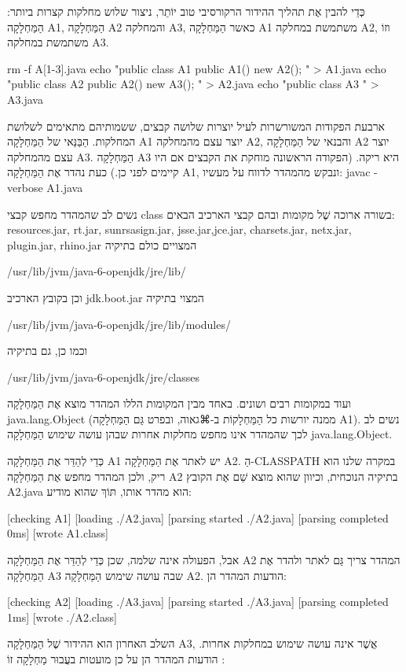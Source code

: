 כְּדֵי להבין אֶת תהליך ההידור הרקורסיבי טוב יוֹתֵר, ניצור שלוש מחלקות קצרות
ביותר: הַמַּחְלָקָה A1, הַמַּחְלָקָה A2 והמחלקה A3, כאשר הַמַּחְלָקָה A1 משתמשת
במחלקה A2, וזוֹ משתמשת במחלקה A3.

rm -f A[1-3].java
echo "public class A1 { public A1() { new A2(); }}" > A1.java
echo "public class A2 { public A2() { new A3(); }}" > A2.java
echo "public class A3 { }" > A3.java
\END

ארבעת הפקודות המשורשרות לעיל יוצרות שלושה קבצים, ששמותיהם מתאימים לשלושת
המחלקות. הַבַּנַּאי של הַמַּחְלָקָה A1 יוצר עצם מהמחלקה A2, והבנאי של
הַמַּחְלָקָה A2 יוצר עצם מהמחלקה A3. הַמַּחְלָקָה A3 היא ריקה. (הפקודה הראשונה
מוחקת את הקבצים אם היו קיימים לפני כן.)
כעת נהדר אֶת הַמַּחְלָקָה A1, ונבקש מהמהדר לדווח על מעשיו:
javac -verbose A1.java
\END

נשים לב שהמהדר מחפש קבצי class בשורה ארוכה שֶׁל מקומות ובהם קבצי הארכיב הבאים:
resources.jar, rt.jar, sunrsasign.jar, jsse.jar,jce.jar, charsets.jar, netx.jar,
plugin.jar, rhino.jar המצויים כולם בתיקיה

/usr/lib/jvm/java-6-openjdk/jre/lib/

וכן בקובץ הארכיב jdk.boot.jar המצוי בתיקיה

/usr/lib/jvm/java-6-openjdk/jre/lib/modules/

וכמו כן, גם בתיקיה

/usr/lib/jvm/java-6-openjdk/jre/classes

ועוד במקומות רבים ושונים. באחד מבין המקומות הללו המהדר מוצא אֶת הַמַּחְלָקָה
java.lang.Object (ממנה יורשות כל הַמַּחְלָקוֹת ב-⌘גאוה, ובפרט גַּם הַמַּחְלָקָה
A1). נשים לב לכך שהמהדר אינו מחפש מחלקות אחרות שבהן עושה שימוש הַמַּחְלָקָה
java.lang.Object.

כְּדֵי לְהַדֵּר אֶת הַמַּחְלָקָה A1 יש לאתר אֶת הַמַּחְלָקָה A2. הַ-CLASSPATH
במקרה שלנו הוא ריק, ולכן המהדר מחפש אֶת הַמַּחְלָקָה A2 בתיקיה הנוכחית, וכיוון
שהוא מוצא שֵׁם אֶת הקובץ A2.java הוא מהדר אותו, תּוֹךְ שהוא מודיע:

[checking A1]
[loading ./A2.java]
[parsing started ./A2.java]
[parsing completed 0ms]
[wrote A1.class]

אבל, הפעולה אינה שלמה, שכן כְּדֵי לְהַדֵּר אֶת הַמַּחְלָקָה A2 המהדר צריך גַּם
לאתר ולהדר אֶת הַמַּחְלָקָה A3 שבה עושה שימוש הַמַּחְלָקָה A2. הודעות המהדר הן:

[checking A2]
[loading ./A3.java]
[parsing started ./A3.java]
[parsing completed 1ms]
[wrote ./A2.class]

השלב האחרון הוא ההידור שֶׁל הַמַּחְלָקָה A3, אֲשֶׁר אינה עושה שימוש במחלקות
אחרות. הודעות המהדר הן על כן מועטות בעֲבוּר מַחְלָקָה זוֹ :


